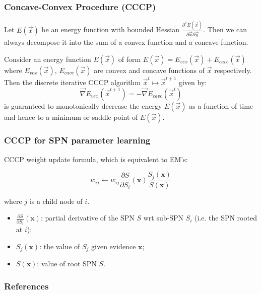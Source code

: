 \documentclass[usenames,dvipsnames]{beamer}
\begin{document}
\begin{frame}
  \frametitle{Concave-Convex Procedure (CCCP)}

  \begin{theorem}
    Let $E(\vec{x})$ be an energy function with bounded Hessian $\frac{\partial^2
    E(\vec{x})}{\partial\vec{x}\partial\vec{y}}$. Then we can
    always decompose it into the sum of a convex function and a concave function.
  \end{theorem}

  \begin{theorem}
    Consider an energy function $E(\vec{x})$ of form $E(\vec{x}) =
    E_{vex}(\vec{x})+E_{cave}(\vec{x})$ where $E_{vex}(\vec{x})$,
    $E_{cave}(\vec{x})$ are convex and concave functions of $\vec{x}$
    respectively. Then the discrete iterative CCCP algorithm $\vec{x}^t\mapsto
    \vec{x}^{t+1}$ given by:
    \begin{equation*}
      \vec{\nabla}E_{vex}\left(\vec{x}^{t+1}\right)=-\vec{\nabla}E_{cave}\left(\vec{x}^t\right)
    \end{equation*}
    is guaranteed to monotonically decrease the energy $E(\vec{x})$ as a function of
    time and hence to a minimum or saddle point of $E(\vec{x})$.
  \end{theorem}
\end{frame}

\begin{frame}
  \frametitle{CCCP for SPN parameter learning}

  CCCP weight update formula, which is equivalent to EM's:
  \vspace{0.125cm}

  \begin{equation*}
    w_{ij} \gets w_{ij} \frac{\partial S}{\partial S_i}(\mathbf{x})\frac{S_j(\mathbf{x})}{S(\mathbf{x})}
  \end{equation*}
  \vspace{0.125cm}

  where $j$ is a child node of $i$.
  \vspace{0.25cm}

  \begin{itemize}
    \item $\frac{\partial S}{\partial S_i}(\mathbf{x})$: partial derivative of the SPN $S$ wrt
      sub-SPN $S_i$ (i.e. the SPN rooted at $i$);
    \item $S_j(\mathbf{x})$: the value of $S_j$ given evidence $\mathbf{x}$;
    \item $S(\mathbf{x})$: value of root SPN $S$.
  \end{itemize}
\end{frame}

\begin{frame}[t,allowframebreaks]
  \frametitle{References}
  \printbibliography[heading=none]
\end{frame}
\end{document}
